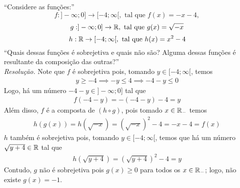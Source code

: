\enquote{Considere as funções:}
\begin{displaymath}
    f: ]-\infty; 0] \rightarrow [-4; \infty[, \text{ tal que } f(x) = -x - 4, 
\end{displaymath}
\begin{displaymath}
    g: ]-\infty; 0] \rightarrow \mathbb R, \text{ tal que } g(x) = \sqrt{-x}
\end{displaymath}
\begin{displaymath}
    h: \mathbb R \rightarrow [-4; \infty[, \text{ tal que } h(x) = x^2 - 4
\end{displaymath}
\enquote{Quais dessas funções é sobrejetiva e quais não são? Alguma dessas funções é resultante da composição das outras?} \\
\emph{Resolução.} Note que $f$ é sobrejetiva pois, tomando $y \in [-4; \infty[$, temos
\begin{align*}
    y \ge -4 \implies -y \le 4 \implies -4 -y \le 0 
\end{align*}
Logo, há um número $-4 - y \in ]-\infty; 0]$ tal que 
\begin{align*}
    f(-4 - y) = -(-4 - y) - 4 = y 
\end{align*}
Além disso, $f$ é a composta de $(h \circ g)$, pois tomado $x \in \mathbb R_-$ temos
\begin{align*}
    h(g(x))  = h(\sqrt{-x}) = (\sqrt{-x})^2 - 4 = -x - 4 = f(x)    
\end{align*}
$h$ também é sobrejetiva pois, tomando $y \in [-4; \infty[$, temos que há um número $\sqrt{y + 4} \in \mathbb R$ tal que
\begin{align*}
    h(\sqrt{y + 4}) = (\sqrt{y + 4})^2 - 4 = y
\end{align*}
Contudo, $g$ não é sobrejetiva pois $g(x) \ge 0$ para todos os $x \in \mathbb R_-$; logo, não existe $g(x) = -1$.